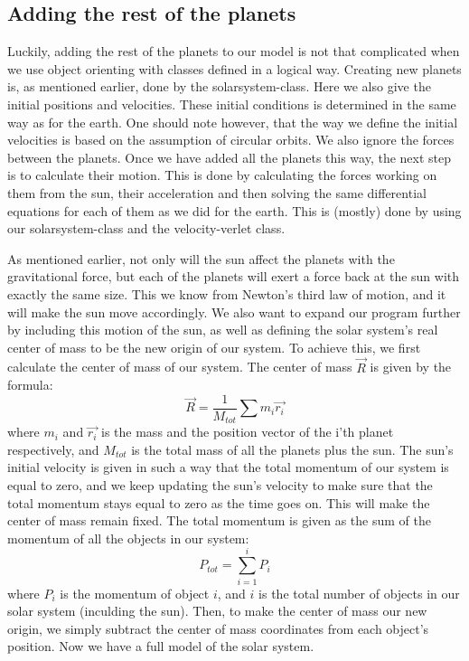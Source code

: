 \documentclass[twocolumn]{article}
\begin{document}
\subsection*{Adding the rest of the planets}
Luckily, adding the rest of the planets to our model is not that complicated when we use object orienting with classes defined in a logical way. Creating new planets is, as mentioned earlier, done by the solarsystem-class. Here we also give the initial positions and velocities. These initial conditions is determined in the same way as for the earth. One should note however, that the way we define the initial velocities is based on the assumption of circular orbits. We also ignore the forces between the planets.\newline
Once we have added all the planets this way, the next step is to calculate their motion. This is done by calculating the forces working on them from the sun, their acceleration and then solving the same differential equations for each of them as we did for the earth. This is (mostly) done by using our solarsystem-class and the velocity-verlet class.\newline

As mentioned earlier, not only will the sun affect the planets with the gravitational force, but each of the planets will exert a force back at the sun with exactly the same size. This we know from Newton's third law of motion, and it will make the sun move accordingly.\newline
We also want to expand our program further by including this motion of the sun, as well as defining the solar system's real center of mass to be the new origin of our system.\newline
To achieve this, we first calculate the center of mass of our system. The center of mass $\vec{R}$ is given by the formula:
$$\vec{R} = \frac{1}{M_{tot}} \sum{m_i \vec{r_i}}$$
where $m_i$ and $\vec{r_i}$ is the mass and the position vector of the i'th planet respectively, and $M_{tot}$ is the total mass of all the planets plus the sun.\newline
The sun's initial velocity is given in such a way that the total momentum of our system is equal to zero, and we keep updating the sun's velocity to make sure that the total momentum stays equal to zero as the time goes on. This will make the center of mass remain fixed. The total momentum is given as the sum of the momentum of all the objects in our system:
$$ P_{tot} = \sum_{i=1}^{i} P_i $$
where $P_i$ is the momentum of object $i$, and $i$ is the total number of objects in our solar system (inculding the sun).
Then, to make the center of mass our new origin, we simply subtract the center of mass coordinates from each object's position.\newline
Now we have a full model of the solar system.
\end{document}
